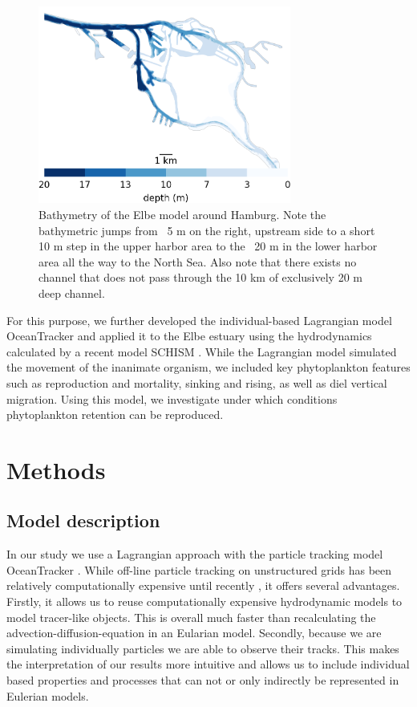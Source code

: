 \documentclass[npg, manuscript]{copernicus}
\begin{document}
\begin{figure}
    \includegraphics[width=8.3cm]{harbor_small.png}
    \caption{Bathymetry of the Elbe model around Hamburg. Note the bathymetric jumps from ~5 \unit{m} on the right, upstream side to a short 10 \unit{m} step in the upper harbor area to the ~20 \unit{m} in the lower harbor area all the way to the North Sea. Also note that there exists no channel that does not pass through the 10 \unit{km} of exclusively 20 \unit{m} deep channel.}
    \label{fig:bathymetry}
\end{figure}

For this purpose, we further developed the individual-based Lagrangian model OceanTracker \citep{Vennell2021} and applied it to the Elbe estuary using the hydrodynamics calculated by a recent model SCHISM \citep{Pein2021}.
While the Lagrangian model simulated the movement of the inanimate organism, we included key phytoplankton features such as reproduction and mortality, sinking and rising, as well as diel vertical migration.
Using this model, we investigate under which conditions phytoplankton retention can be reproduced.

\section{Methods}

\subsection{Model description}

In our study we use a Lagrangian approach with the particle tracking model OceanTracker \citep{Vennell2021}.
While off-line particle tracking on unstructured grids has been relatively computationally expensive until recently \citep{Vennell2021}, it offers several advantages.
Firstly, it allows us to reuse computationally expensive hydrodynamic models to model tracer-like objects.
This is overall much faster than recalculating the advection-diffusion-equation in an Eularian model.
Secondly, because we are simulating individually particles we are able to observe their tracks.
This makes the interpretation of our results more intuitive and allows us to include individual based properties and processes that can not or only indirectly be represented in Eulerian models.
\end{document}
